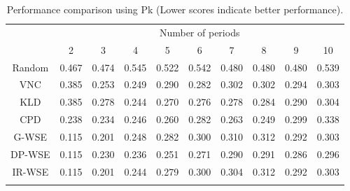 \documentclass[output=paper]{langsci/langscibook}
\begin{document}
\begin{table}
\small
\caption{Performance comparison using Pk (Lower scores indicate better performance).}
\label{pk}
\centering
\begin{tabular}{cccccccccc}
\lsptoprule
\multirow{2}{*}{Acronym} & \multicolumn{9}{c}{Number of periods}\\ \cmidrule(lr){2-10} 
                                                                           & 2              & 3              & 4              & 5              & 6              & 7              & 8              & 9              & 10             \\ \midrule
Random                   & 0.467          & 0.474          & 0.545          & 0.522          & 0.542          & 0.480          & 0.480          & 0.480          & 0.539          \\  
                                                  VNC                      & 0.385          & 0.253          & 0.249          & 0.290          & 0.282          & 0.302          & 0.302          & 0.294          & 0.303          \\  
                                                  KLD              & 0.385          & 0.278          & 0.244          & 0.270          & 0.276          & 0.278          & 0.284          & 0.290          & 0.304          \\  
                                                  CPD                 & 0.238          & 0.234          & 0.246          & 0.260          & 0.282          & 0.263 & 0.249 & 0.299          & 0.338          \\ 
G-WSE                   & 0.115 & 0.201 & 0.248          & 0.282          & 0.300          & 0.310          & 0.312          & 0.292          & 0.303          \\  
                                                  DP-WSE                  & 0.115 & 0.230          & 0.236 & 0.251 & 0.271 & 0.290          & 0.291          & 0.286 & 0.296 \\  
                                                  IR-WSE                  & 0.115 & 0.201 & 0.244
                                                 & 0.279          & 0.300          & 0.304          & 0.312          & 0.292          & 0.303          \\ \lspbottomrule
\end{tabular}
\end{table}
\end{document}
